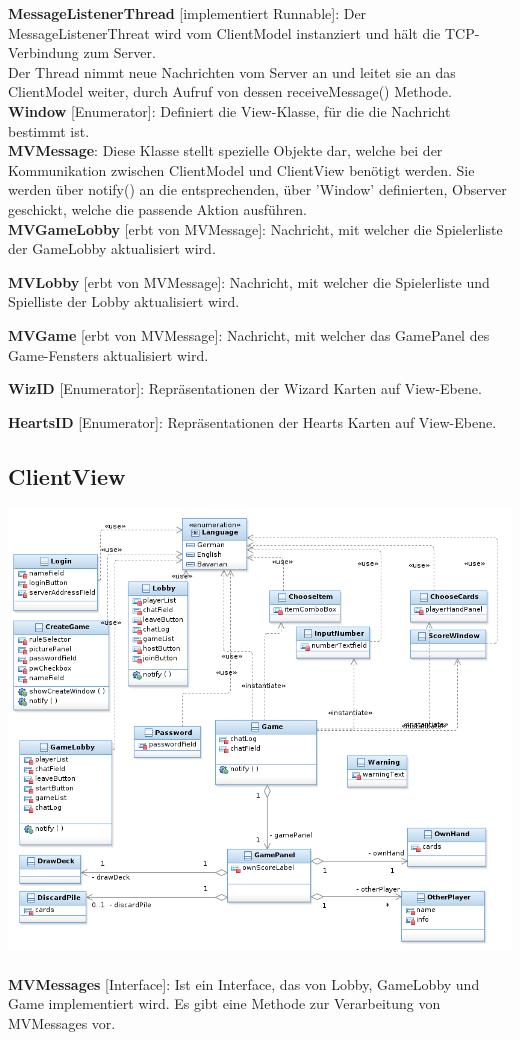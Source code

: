 \documentclass{article}
\begin{document}
\textbf{MessageListenerThread} [implementiert Runnable]: Der MessageListenerThreat wird vom ClientModel instanziert und hält die TCP-Verbindung zum Server. \\
Der Thread nimmt neue Nachrichten vom Server an und leitet sie an das ClientModel weiter, durch Aufruf von dessen receiveMessage() Methode.\\

\textbf{Window} [Enumerator]: Definiert die View-Klasse, für die die Nachricht bestimmt ist. \\

\textbf{MVMessage}: Diese Klasse stellt spezielle Objekte dar, welche bei der Kommunikation zwischen ClientModel und ClientView benötigt werden. Sie werden über notify() an die entsprechenden, über 'Window' definierten, Observer geschickt, welche die passende Aktion ausführen. \\

\textbf{MVGameLobby} [erbt von MVMessage]: Nachricht, mit welcher die Spielerliste der GameLobby aktualisiert wird.

\textbf{MVLobby} [erbt von MVMessage]: Nachricht, mit welcher die Spielerliste und Spielliste der Lobby aktualisiert wird.

\textbf{MVGame} [erbt von MVMessage]: Nachricht, mit welcher das GamePanel des Game-Fensters aktualisiert wird.

\textbf{WizID} [Enumerator]: Repräsentationen der Wizard Karten auf View-Ebene.

\textbf{HeartsID} [Enumerator]: Repräsentationen der Hearts Karten auf View-Ebene.

\subsection{ClientView}
\includegraphics[width=\textwidth]{Entwurf_ViewDiagram}
\\ \\
\textbf{MVMessages} [Interface]:  Ist ein Interface, das von Lobby, GameLobby und Game implementiert wird. Es gibt eine Methode zur Verarbeitung von MVMessages vor. \\
\end{document}
